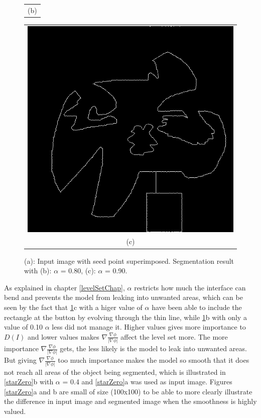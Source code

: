 \begin{figure}[h!]
\begin{minipage}{.49\textwidth}
\begin{tabular}{c}
(b)
\end{tabular}
\end{minipage}
\begin{minipage}{.49\textwidth}
\begin{tabular}{c}
\includegraphics[width=.9\textwidth]{results/2D/randOrgWSeeda090} \\
(c)
\end{tabular}
\end{minipage}
\caption{(a): Input image with seed point superimposed. Segmentation result with (b): $\alpha$ = 0.80, (c): $\alpha$ = 0.90.}
\label{randOrgWSeed}
\end{figure}
As explained in chapter \ref{levelSetChap}, $\alpha$ restricts how much the interface can bend and prevents the model from leaking into unwanted areas, which can be seen by the fact that \ref{randOrgWSeed}c with a higer value of $\alpha$ have been able to include the rectangle at the button by evolving through the thin line, while \ref{randOrgWSeed}b with only a value of 0.10 $\alpha$ less did not manage it. Higher values gives more importance to \(D(I)\) and lower values makes \(\nabla \frac{\nabla \phi}{|\nabla \phi|}\) affect the level set more. The more importance \(\nabla \frac{\nabla \phi}{|\nabla \phi|}\) gets, the less likely is the model to leak into unwanted areas. But giving \(\nabla \frac{\nabla \phi}{|\nabla \phi|}\) too much importance makes the model so smooth that it does not reach all areas of the object being segmented, which is illustrated in \ref{starZero}b with $\alpha$ = 0.4 and \ref{starZero}a was used as input image. Figures \ref{starZero}a and b are small of size (100x100) to be able to more clearly illustrate the difference in input image and segmented image when the smoothness is highly valued.
